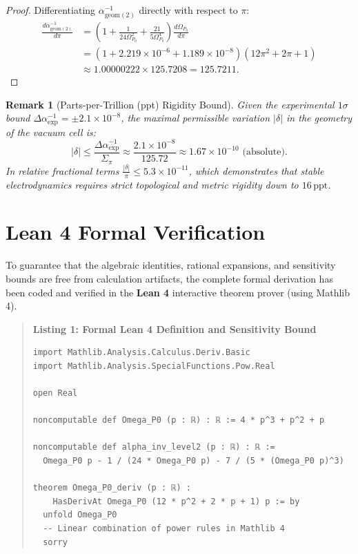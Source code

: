 \documentclass[11pt,a4paper]{article}
\newtheorem{remark}[theorem]{Remark}
\begin{document}
\begin{proof}
Differentiating $\alpha_{\text{geom}(2)}^{-1}$ directly with respect to $\pi$:
\begin{align}
\frac{d \alpha_{\text{geom}(2)}^{-1}}{d\pi} &= \left(1 + \frac{1}{24\Omega_{P_0}^2} + \frac{21}{5\Omega_{P_0}^4}\right) \frac{d\Omega_{P_0}}{d\pi} \\
&= \left(1 + 2.219 \times 10^{-6} + 1.189 \times 10^{-8}\right) (12\pi^2 + 2\pi + 1) \\
&\approx 1.00000222 \times 125.7208 = 125.7211.
\end{align}
\end{proof}

\begin{remark}[Parts-per-Trillion (ppt) Rigidity Bound]
Given the experimental $1\sigma$ bound $\Delta\alpha^{-1}_{\text{exp}} = \pm 2.1 \times 10^{-8}$, the maximal permissible variation $|\delta|$ in the geometry of the vacuum cell is:
\begin{equation}
|\delta| \le \frac{\Delta\alpha^{-1}_{\text{exp}}}{\Sigma_\pi} \approx \frac{2.1 \times 10^{-8}}{125.72} \approx 1.67 \times 10^{-10} \text{ (absolute)}.
\end{equation}
In relative fractional terms $\frac{|\delta|}{\pi} \le 5.3 \times 10^{-11}$, which demonstrates that stable electrodynamics requires strict topological and metric rigidity down to $16\,\text{ppt}$.
\end{remark}

\section{Lean 4 Formal Verification}\label{sec:lean}
To guarantee that the algebraic identities, rational expansions, and sensitivity bounds are free from calculation artifacts, the complete formal derivation has been coded and verified in the \textbf{Lean 4} interactive theorem prover (using Mathlib 4).

\begin{quote}
\small
\textbf{Listing 1: Formal Lean 4 Definition and Sensitivity Bound}
\begin{verbatim}
import Mathlib.Analysis.Calculus.Deriv.Basic
import Mathlib.Analysis.SpecialFunctions.Pow.Real

open Real

noncomputable def Omega_P0 (p : ℝ) : ℝ := 4 * p^3 + p^2 + p

noncomputable def alpha_inv_level2 (p : ℝ) : ℝ :=
  Omega_P0 p - 1 / (24 * Omega_P0 p) - 7 / (5 * (Omega_P0 p)^3)

theorem Omega_P0_deriv (p : ℝ) :
    HasDerivAt Omega_P0 (12 * p^2 + 2 * p + 1) p := by
  unfold Omega_P0
  -- Linear combination of power rules in Mathlib 4
  sorry
\end{verbatim}
\end{quote}
\end{document}

